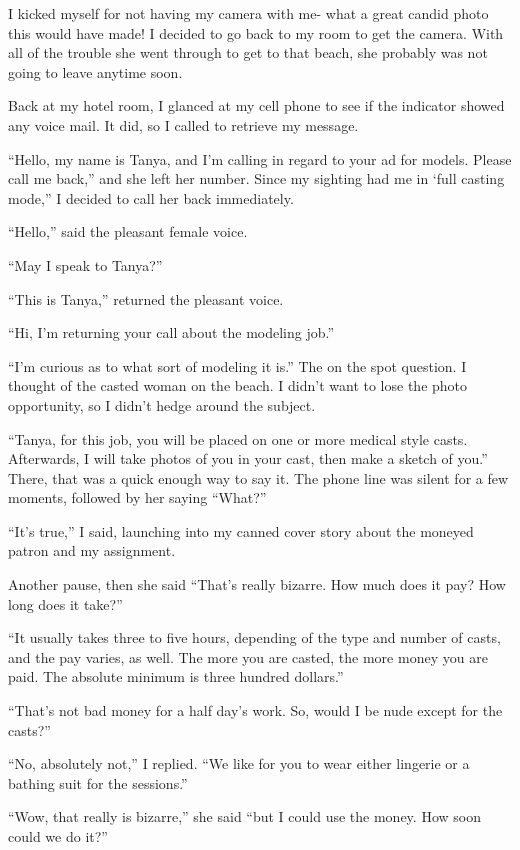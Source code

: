 I kicked myself for not having my camera with me- what a great candid photo this would have
made! I decided to go back to my room to get the camera. With all of the trouble she went
through to get to that beach, she probably was not going to leave anytime soon.

Back at my hotel room, I glanced at my cell phone to see if the indicator showed any voice
mail. It did, so I called to retrieve my message.

``Hello, my name is Tanya, and I'm calling in regard to your ad for models. Please call me
back,'' and she left her number. Since my sighting had me in ‘full casting mode,'' I decided to
call her back immediately.

``Hello,'' said the pleasant female voice.

``May I speak to Tanya?''

``This is Tanya,'' returned the pleasant voice.

``Hi, I'm returning your call about the modeling job.''

``I'm curious as to what sort of modeling it is.'' The on the spot question. I thought of the
casted woman on the beach. I didn't want to lose the photo opportunity, so I didn't hedge around
the subject.

``Tanya, for this job, you will be placed on one or more medical style casts. Afterwards, I
will take photos of you in your cast, then make a sketch of you.'' There, that was a quick
enough
way to say it. The phone line was silent for a few moments, followed by her saying ``What?''

``It's true,'' I said, launching into my canned cover story about the moneyed patron and my
assignment.

Another pause, then she said ``That's really bizarre. How much does it pay? How long does it
take?''

``It usually takes three to five hours, depending of the type and number of casts, and the
pay varies, as well. The more you are casted, the more money you are paid. The absolute minimum
is three hundred dollars.''

``That's not bad money for a half day's work. So, would I be nude except for the casts?''

``No, absolutely not,'' I replied. ``We like for you to wear either lingerie or a bathing suit
for the sessions.''

``Wow, that really is bizarre,'' she said ``but I could use the money. How soon could we do
it?''

